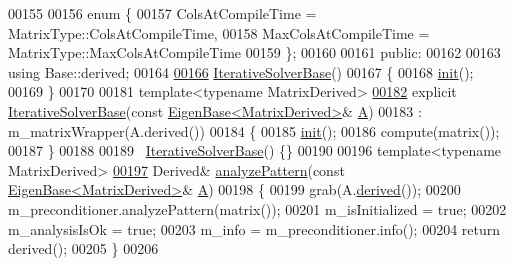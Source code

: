 \begin{DoxyCode}
00155 
00156   \textcolor{keyword}{enum} \{
00157     ColsAtCompileTime = MatrixType::ColsAtCompileTime,
00158     MaxColsAtCompileTime = MatrixType::MaxColsAtCompileTime
00159   \};
00160 
00161 \textcolor{keyword}{public}:
00162 
00163   \textcolor{keyword}{using} Base::derived;
00164 
\hyperlink{group___iterative_linear_solvers___module_a0922f2be45082690d7734aa6732fc493}{00166}   \hyperlink{group___iterative_linear_solvers___module_a0922f2be45082690d7734aa6732fc493}{IterativeSolverBase}()
00167   \{
00168     \hyperlink{structinit}{init}();
00169   \}
00170 
00181   \textcolor{keyword}{template}<\textcolor{keyword}{typename} MatrixDerived>
\hyperlink{group___iterative_linear_solvers___module_a3c68fe3cd929ea1ff8a0d4cbcd65ebad}{00182}   \textcolor{keyword}{explicit} \hyperlink{group___iterative_linear_solvers___module_a3c68fe3cd929ea1ff8a0d4cbcd65ebad}{IterativeSolverBase}(\textcolor{keyword}{const} \hyperlink{group___core___module_struct_eigen_1_1_eigen_base}{EigenBase<MatrixDerived>}& 
      \hyperlink{group___core___module_class_eigen_1_1_matrix}{A})
00183     : m\_matrixWrapper(A.derived())
00184   \{
00185     \hyperlink{structinit}{init}();
00186     compute(matrix());
00187   \}
00188 
00189   ~\hyperlink{group___iterative_linear_solvers___module_class_eigen_1_1_iterative_solver_base}{IterativeSolverBase}() \{\}
00190   
00196   \textcolor{keyword}{template}<\textcolor{keyword}{typename} MatrixDerived>
\hyperlink{group___iterative_linear_solvers___module_a3f684fb41019ca04d97ddc08a0d8be2e}{00197}   Derived& \hyperlink{group___iterative_linear_solvers___module_a3f684fb41019ca04d97ddc08a0d8be2e}{analyzePattern}(\textcolor{keyword}{const} \hyperlink{group___core___module_struct_eigen_1_1_eigen_base}{EigenBase<MatrixDerived>}& 
      \hyperlink{group___core___module_class_eigen_1_1_matrix}{A})
00198   \{
00199     grab(A.\hyperlink{group___core___module_a324b16961a11d2ecfd2d1b7dd7946545}{derived}());
00200     m\_preconditioner.analyzePattern(matrix());
00201     m\_isInitialized = \textcolor{keyword}{true};
00202     m\_analysisIsOk = \textcolor{keyword}{true};
00203     m\_info = m\_preconditioner.info();
00204     \textcolor{keywordflow}{return} derived();
00205   \}
00206   

\end{DoxyCode}
